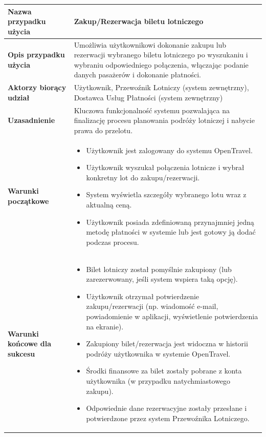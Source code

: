 \documentclass[a4paper,12pt]{article}
\begin{document}
\begin{longtable}{|p{\pierwszakolumnaszerokoscPUBLZakRes}|p{\drugakolumnaszerokoscPUBLZakRes}|}
    \textbf{Nazwa przypadku użycia} & Zakup/Rezerwacja biletu lotniczego \\
    \hline
    \textbf{Opis przypadku użycia} & Umożliwia użytkownikowi dokonanie zakupu lub rezerwacji wybranego biletu lotniczego po wyszukaniu i wybraniu odpowiedniego połączenia, włączając podanie danych pasażerów i dokonanie płatności. \\
    \hline
    \textbf{Aktorzy biorący udział} & Użytkownik, Przewoźnik Lotniczy (system zewnętrzny), Dostawca Usług Płatności (system zewnętrzny) \\
    \hline
    \textbf{Uzasadnienie} & Kluczowa funkcjonalność systemu pozwalająca na finalizację procesu planowania podróży lotniczej i nabycie prawa do przelotu. \\
    \hline
    \textbf{Warunki początkowe} &
        \begin{itemize} \itemsep0pt \parskip0pt \parsep0pt
            \item Użytkownik jest zalogowany do systemu OpenTravel.
            \item Użytkownik wyszukał połączenia lotnicze i wybrał konkretny lot do zakupu/rezerwacji.
            \item System wyświetla szczegóły wybranego lotu wraz z aktualną ceną.
            \item Użytkownik posiada zdefiniowaną przynajmniej jedną metodę płatności w systemie lub jest gotowy ją dodać podczas procesu.
        \end{itemize} \\
    \hline
    \textbf{Warunki końcowe dla sukcesu} &
        \begin{itemize} \itemsep0pt \parskip0pt \parsep0pt
            \item Bilet lotniczy został pomyślnie zakupiony (lub zarezerwowany, jeśli system wspiera taką opcję).
            \item Użytkownik otrzymał potwierdzenie zakupu/rezerwacji (np. wiadomość e-mail, powiadomienie w aplikacji, wyświetlenie potwierdzenia na ekranie).
            \item Zakupiony bilet/rezerwacja jest widoczna w historii podróży użytkownika w systemie OpenTravel.
            \item Środki finansowe za bilet zostały pobrane z konta użytkownika (w przypadku natychmiastowego zakupu).
            \item Odpowiednie dane rezerwacyjne zostały przesłane i potwierdzone przez system Przewoźnika Lotniczego.
        \end{itemize} \\

\end{longtable}
\end{document}
